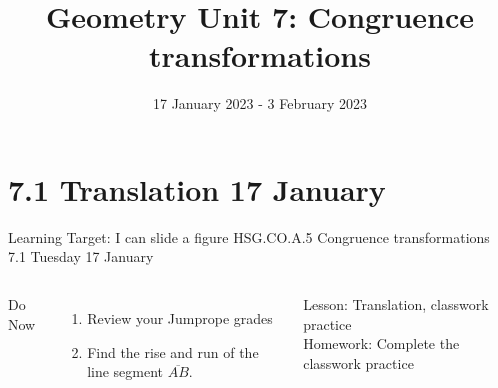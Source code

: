 

\newcommand\ticks{}
  \def\ticks{{Bar[scale=2]}-{Bar[scale=2]}}
\newcommand\paraticks{}
  \def\paraticks{{Straight Barb[reversed, scale=2]}-{Straight Barb[scale=2]}}

\title{Geometry Unit 7: Congruence transformations}
\date{17 January 2023 - 3 February 2023}


\frame{\titlepage}
\section[Outline]{}
\frame{\tableofcontents}

\section{7.1 Translation \hfill 17 January \,}
\begin{frame}{Learning Target: I can slide a figure}
  {HSG.CO.A.5 Congruence transformations \hfill \alert{7.1 Tuesday 17 January}}
  \begin{columns}
    Do Now
    \begin{enumerate}
      \item Review your Jumprope grades
      \item Find the rise and run of the line segment $\overline{AB}$.
    \end{enumerate}
    Lesson: Translation, classwork practice \\
    Homework: Complete the classwork practice
    \begin{flushright}
    \end{flushright}
  \end{columns}
\end{frame}

